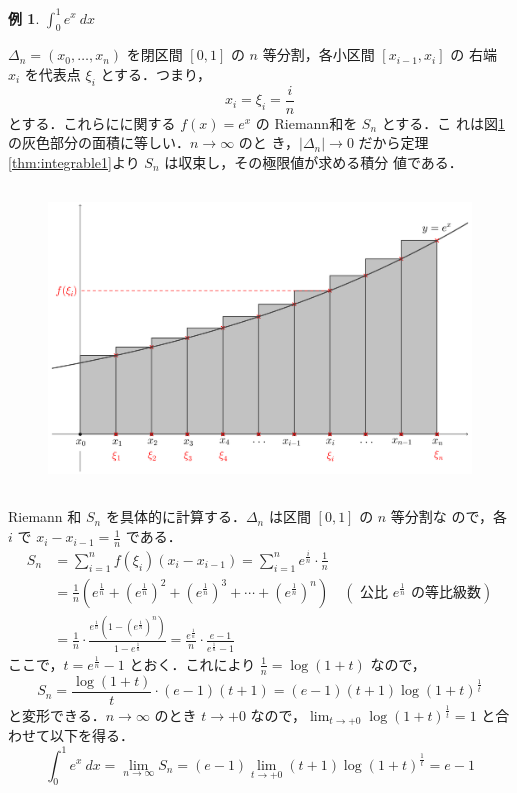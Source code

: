 \documentclass[10pt, uplatex, dvipdfmx]{jsarticle}
\theoremstyle{definition}
\newtheorem{example}[theorem]{例}
\numberwithin{equation}{section}
\newcommand{\ds}{\displaystyle}
\begin{document}
\newpage

\begin{example}
  $\ds \int_{0}^{1} e^x \ dx$ 

  \vspace{1zh}
  
  $\Delta_n=(x_0,\ldots, x_n)$ を閉区間 $[0,1]$ の $n$ 等分割，各小区間 $[x_{i-1},x_i]$ の
  右端 $x_i$ を代表点 $\xi_i$ とする．つまり，
  \[
    x_i = \xi_i = \frac{i}{n}
  \]
  とする．これらにに関する $f(x) = e^x$ の Riemann和を $S_n$ とする．こ
  れは図\ref{fig:Rsum_exp}の灰色部分の面積に等しい．$n \to \infty$ のと
  き，$|\Delta_n| \to 0$ だから定理\ref{thm:integrable1}より $S_n$ は収束し，その極限値が求める積分
  値である．
  \begin{figure}[h]
    \centering
    \includegraphics[height=8cm]{./pictures/02/exp.pdf}
    \caption{}\label{fig:Rsum_exp}
  \end{figure}
\end{example}

Riemann 和 $S_n$ を具体的に計算する．$\Delta_n$ は区間 $[0,1]$ の $n$ 等分割な
ので，各 $i$ で $\ds x_i-x_{i-1} = \frac{1}{n}$ である．
\[
  \begin{aligned}
    S_n &= \sum_{i=1}^{n} f(\xi_i) (x_i-x_{i-1}) = \sum_{i=1}^{n} e^{\frac{i}{n}} \cdot \frac{1}{n}\\
        & = \frac{1}{n} \left( e^{\frac{1}{n}}
          + \left(e^{\frac{1}{n}}\right)^2 + \left( e^{\frac{1}{n}}\right)^3 +\cdots
          + \left( e^{\frac{1}{n}}\right)^n\right) \quad \left( \text{ 公比 $e^{\frac{1}{n}}$ の等比級数}\right)\\
        & = \frac{1}{n} \cdot \frac{e^{\frac{1}{n}} \left( 1 - \left( e^{\frac{1}{n}}\right)^n\right)}{1-e^{\frac{1}{n}}}
          = \frac{e^{\frac{1}{n}}}{n} \cdot \frac{e-1}{e^{\frac{1}{n}}-1}
  \end{aligned}
\]
ここで，$\ds t=e^{\frac{1}{n}}-1$ とおく．これにより $\ds \frac{1}{n} = \log(1+t)$ なので，
\[
  S_n = \frac{\log(1+t)}{t} \cdot (e-1)(t+1) = (e-1) (t+1) \log(1+t)^{\frac{1}{t}}
\]
と変形できる．$n \to \infty$ のとき $t \to +0$ なので，$\ds \lim_{t \to +0} \log (1+t)^{\frac{1}{t}}=1$ と合わせて以下を得る．
\[
  \int_{0}^{1} e^x \ dx = \lim_{n \to \infty} S_n = (e-1) \lim_{t\to +0} (t+1) \log (1+t)^{\frac{1}{t}} = e-1
\]
\end{document}
